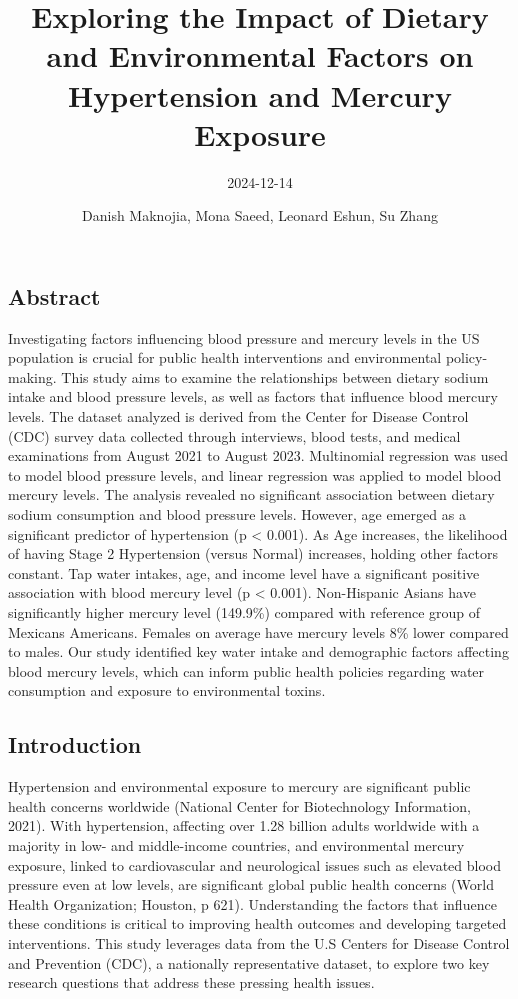 \documentclass[
  letterpaper,
  DIV=11,
  numbers=noendperiod]{scrartcl}
\title{Exploring the Impact of Dietary and Environmental Factors on
Hypertension and Mercury Exposure}
\subtitle{2024-12-14}
\author{Danish Maknojia, Mona Saeed, Leonard Eshun, Su Zhang}
\date{}
\begin{document}
\maketitle


\subsection{Abstract}\label{abstract}

Investigating factors influencing blood pressure and mercury levels in
the US population is crucial for public health interventions and
environmental policy-making. This study aims to examine the
relationships between dietary sodium intake and blood pressure levels,
as well as factors that influence blood mercury levels. The dataset
analyzed is derived from the Center for Disease Control (CDC) survey
data collected through interviews, blood tests, and medical examinations
from August 2021 to August 2023. Multinomial regression was used to
model blood pressure levels, and linear regression was applied to model
blood mercury levels. The analysis revealed no significant association
between dietary sodium consumption and blood pressure levels. However,
age emerged as a significant predictor of hypertension (p \textless{}
0.001). As Age increases, the likelihood of having Stage 2 Hypertension
(versus Normal) increases, holding other factors constant. Tap water
intakes, age, and income level have a significant positive association
with blood mercury level (p \textless{} 0.001). Non-Hispanic Asians have
significantly higher mercury level (149.9\%) compared with reference
group of Mexicans Americans. Females on average have mercury levels 8\%
lower compared to males. Our study identified key water intake and
demographic factors affecting blood mercury levels, which can inform
public health policies regarding water consumption and exposure to
environmental toxins.

\subsection{Introduction}\label{introduction}

Hypertension and environmental exposure to mercury are significant
public health concerns worldwide (National Center for Biotechnology
Information, 2021). With hypertension, affecting over 1.28 billion
adults worldwide with a majority in low- and middle-income countries,
and environmental mercury exposure, linked to cardiovascular and
neurological issues such as elevated blood pressure even at low levels,
are significant global public health concerns (World Health
Organization; Houston, p 621). Understanding the factors that influence
these conditions is critical to improving health outcomes and developing
targeted interventions. This study leverages data from the U.S Centers
for Disease Control and Prevention (CDC), a nationally representative
dataset, to explore two key research questions that address these
pressing health issues.
\end{document}
